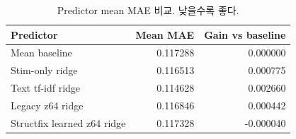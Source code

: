 \begin{table}[t]
\centering
\caption{Predictor mean MAE 비교. 낮을수록 좋다.}
\label{tab:predictor-comparison}
\begin{tabular}{lrr}
\toprule
Predictor & Mean MAE & Gain vs baseline \\
\midrule
Mean baseline & 0.117288 & 0.000000 \\
Stim-only ridge & 0.116513 & 0.000775 \\
Text tf-idf ridge & 0.114628 & 0.002660 \\
Legacy z64 ridge & 0.116846 & 0.000442 \\
Structfix learned z64 ridge & 0.117328 & -0.000040 \\
\bottomrule
\end{tabular}
\end{table}
